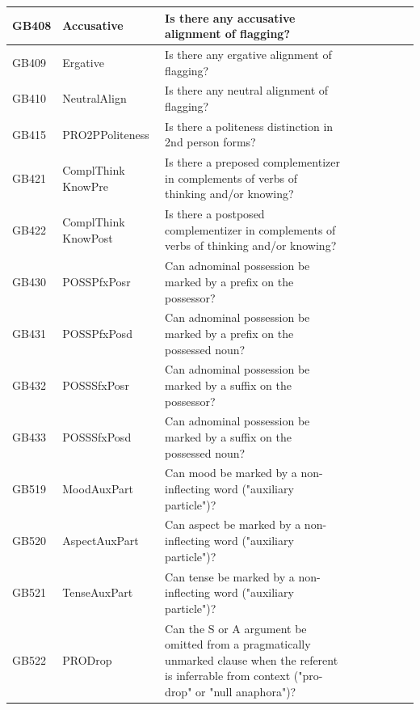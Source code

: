 \documentclass[draft,10pt]{article} %
\begin{document}
\begin{landscape}
\begin{longtable}{| l | p{4cm}| p{12cm}|p{2cm}|p{2cm}|p{2cm}|p{2cm}|p{2cm}|p{2cm}|}
GB408 & Accusative&Is there any accusative alignment of flagging?\\ \hline
GB409 & Ergative&Is there any ergative alignment of flagging?\\ \hline
GB410 & NeutralAlign&Is there any neutral alignment of flagging?\\ \hline
GB415 & PRO2PPoliteness&Is there a politeness distinction in 2nd person forms?\\ \hline
GB421 & ComplThink KnowPre&Is there a preposed complementizer in complements of verbs of thinking and/or knowing?\\ \hline
GB422 & ComplThink KnowPost&Is there a postposed complementizer in complements of verbs of thinking and/or knowing?\\ \hline
GB430 & POSSPfxPosr&Can adnominal possession be marked by a prefix on the possessor?\\ \hline
GB431 & POSSPfxPosd&Can adnominal possession be marked by a prefix on the possessed noun?\\ \hline
GB432 & POSSSfxPosr &Can adnominal possession be marked by a suffix on the possessor?\\ \hline
GB433 & POSSSfxPosd&Can adnominal possession be marked by a suffix on the possessed noun?\\ \hline
GB519 & MoodAuxPart&Can mood be marked by a non-inflecting word ("auxiliary particle")?\\ \hline
GB520 & AspectAuxPart&Can aspect be marked by a non-inflecting word ("auxiliary particle")?\\ \hline
GB521 & TenseAuxPart&Can tense be marked by a non-inflecting word ("auxiliary particle")?\\ \hline
GB522 & PRODrop&Can the S or A argument be omitted from a pragmatically unmarked clause when the referent is inferrable from context ("pro-drop" or "null anaphora")? \\ \hline



 \end{longtable}
\end{landscape}
\newpage






\newpage
\end{document}
